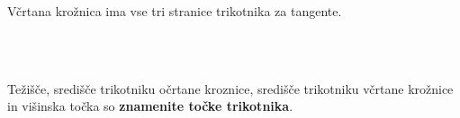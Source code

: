 \begin{izrek}
\begin{figure}[H]
                
        \end{figure}

        \end{izrek}


        
            Včrtana krožnica ima vse tri stranice trikotnika za tangente.



    ~\\~

        
            Težišče, središče trikotniku očrtane kroznice, središče trikotniku včrtane krožnice in višinska točka so \textbf{znamenite točke trikotnika}.


